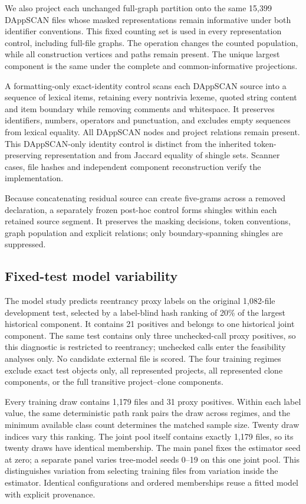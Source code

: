 \documentclass[preprint,12pt]{elsarticle}
\begin{document}
We also project each unchanged full-graph partition onto the same 15,399 DAppSCAN files whose masked representations remain informative under both identifier conventions. This fixed counting set is used in every representation control, including full-file graphs. The operation changes the counted population, while all construction vertices and paths remain present. The unique largest component is the same under the complete and common-informative projections.

A formatting-only exact-identity control scans each DAppSCAN source into a sequence of lexical items, retaining every nontrivia lexeme, quoted string content and item boundary while removing comments and whitespace. It preserves identifiers, numbers, operators and punctuation, and excludes empty sequences from lexical equality. All DAppSCAN nodes and project relations remain present. This DAppSCAN-only identity control is distinct from the inherited token-preserving representation and from Jaccard equality of shingle sets. Scanner cases, file hashes and independent component reconstruction verify the implementation.

Because concatenating residual source can create five-grams across a removed declaration, a separately frozen post-hoc control forms shingles within each retained source segment. It preserves the masking decisions, token conventions, graph population and explicit relations; only boundary-spanning shingles are suppressed.

\subsection{Fixed-test model variability}\label{fixed-test-model-variability}

The model study predicts reentrancy proxy labels on the original 1,082-file development test, selected by a label-blind hash ranking of 20\% of the largest historical component. It contains 21 positives and belongs to one historical joint component. The same test contains only three unchecked-call proxy positives, so this diagnostic is restricted to reentrancy; unchecked calls enter the feasibility analyses only. No candidate external file is scored. The four training regimes exclude exact test objects only, all represented projects, all represented clone components, or the full transitive project--clone components.

Every training draw contains 1,179 files and 31 proxy positives. Within each label value, the same deterministic path rank pairs the draw across regimes, and the minimum available class count determines the matched sample size. Twenty draw indices vary this ranking. The joint pool itself contains exactly 1,179 files, so its twenty draws have identical membership. The main panel fixes the estimator seed at zero; a separate panel varies tree-model seeds 0--19 on this one joint pool. This distinguishes variation from selecting training files from variation inside the estimator. Identical configurations and ordered memberships reuse a fitted model with explicit provenance.
\end{document}
